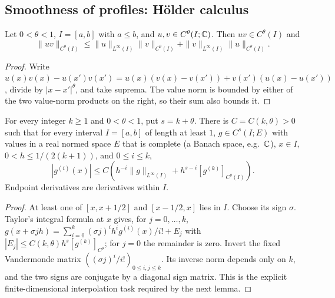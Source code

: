 \subsection{Smoothness of profiles: H\"older calculus}

\begin{lemma}
  \label{lem:c03_holder_product_base}
  Let $0<\theta<1$, $I=[a,b]$ with $a\le b$, and $u,v\in C^\theta(I;\mathbb{C})$.
  Then $uv\in C^\theta(I)$ and
  \[
    \|uv\|_{C^\theta(I)}\le
    \|u\|_{L^\infty(I)}\|v\|_{C^\theta(I)}+
    \|v\|_{L^\infty(I)}\|u\|_{C^\theta(I)}.
  \]
\end{lemma}
\begin{proof}
  Write $u(x)v(x)-u(x')v(x')=u(x)(v(x)-v(x'))+v(x')(u(x)-u(x'))$,
  divide by $|x-x'|^\theta$, and take suprema. The value norm is bounded by either
  of the two value-norm products on the right, so their sum also bounds it.
\end{proof}

\begin{lemma}
  \label{lem:c03_holder_stencil}
  For every integer $k\ge1$ and $0<\theta<1$, put $s=k+\theta$.
  There is $C=C(k,\theta)>0$ such that for every interval $I=[a,b]$ of length at least $1$,
  $g\in C^s(I;E)$ with values in a real normed space $E$ that is complete (a Banach space, e.g.\ $\mathbb{C}$),
  $x\in I$, $0<h\le1/(2(k+1))$, and $0\le i\le k$,
  \[
    |g^{(i)}(x)|\le C\left(h^{-i}\|g\|_{L^\infty(I)}
              +h^{s-i}[g^{(k)}]_{C^\theta(I)}\right).
  \]
  Endpoint derivatives are derivatives within $I$.
\end{lemma}
\begin{proof}
  At least one of $[x,x+1/2]$ and $[x-1/2,x]$ lies in $I$. Choose its sign $\sigma$.
  Taylor's integral formula at $x$ gives, for $j=0,\ldots,k$,
  $g(x+\sigma jh)=\sum_{i=0}^k (\sigma j)^ih^ig^{(i)}(x)/i!+E_j$ with
  $|E_j|\le C(k,\theta)h^s[g^{(k)}]_{C^\theta}$; for $j=0$ the remainder is zero.
  Invert the fixed Vandermonde matrix $((\sigma j)^i/i!)_{0\le i,j\le k}$.
  Its inverse norm depends only on $k$, and the two signs are conjugate by a diagonal sign matrix.
  This is the explicit finite-dimensional interpolation task required by the next lemma.
\end{proof}

